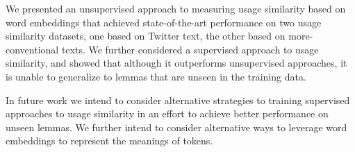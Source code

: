 \documentclass[11pt]{article}
\begin{document}
We presented an unsupervised approach to measuring usage similarity
based on word embeddings that achieved state-of-the-art performance on
two usage similarity datasets, one based on Twitter text, the other
based on more-conventional texts. We further considered a supervised
approach to usage similarity, and showed that although it outperforms
unsupervised approaches, it is unable to generalize to lemmas that are
unseen in the training data.



In future work we intend to consider alternative strategies to
training supervised approaches to usage similarity in an effort to
achieve better performance on unseen lemmas. We further intend to
consider alternative ways to leverage word embeddings to represent the
meanings of tokens.















\let\temp\thebibliography
\renewcommand{\thebibliography}[1]{%
\temp{#1}%
\setlength{\baselineskip}{0.87\baselineskip}%
\setlength{\itemsep}{3pt}%
}



\end{document}
